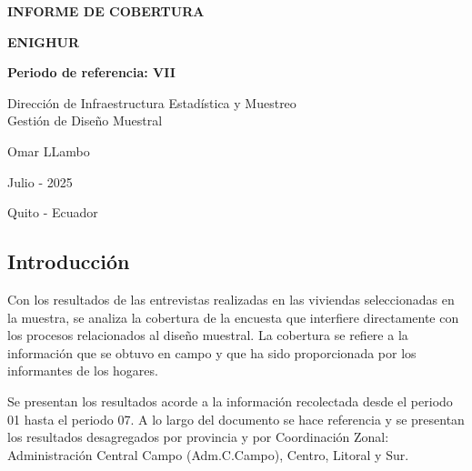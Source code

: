 \documentclass[
]{article}
\begin{document}
\begin{titlepage}
  \begin{center}
    \vspace*{5cm}
    
    {\Huge\bfseries \textcolor{trueblue}{INFORME DE COBERTURA}   \par}
    \vspace{0.2cm}
    
    {\Huge\bfseries \textcolor{trueblue} {ENIGHUR} \par}
    \vspace{0.2   cm}
    
    {\Large\bfseries \textcolor{trueblue} {Periodo de referencia: VII} \par}
    \vspace{1cm}
    
    {\Large  \textcolor{trueblue}{Dirección de Infraestructura Estadística y Muestreo \\ 
    Gestión de Diseño Muestral}
    \par}
    \vspace{0.25cm}
    
    {\large  \textcolor{trueblue}{Omar LLambo} \par}
    \vspace{0.25cm}
    
    
    \vfill
    
    {\large \textcolor{trueblue} {Julio - 2025}\par}
    {\large \textcolor{trueblue} {Quito - Ecuador}\par}
  \end{center}
\end{titlepage}


\newpage

\textcolor{trueblue}{\section{Introducción}}

Con los resultados de las entrevistas realizadas en las viviendas
seleccionadas en la muestra, se analiza la cobertura de la encuesta que
interfiere directamente con los procesos relacionados al diseño
muestral. La cobertura se refiere a la información que se obtuvo en
campo y que ha sido proporcionada por los informantes de los hogares.

Se presentan los resultados acorde a la información recolectada desde el
periodo 01 hasta el periodo 07. A lo largo del documento se hace
referencia y se presentan los resultados desagregados por provincia y
por Coordinación Zonal: Administración Central Campo (Adm.C.Campo),
Centro, Litoral y Sur.
\end{document}

